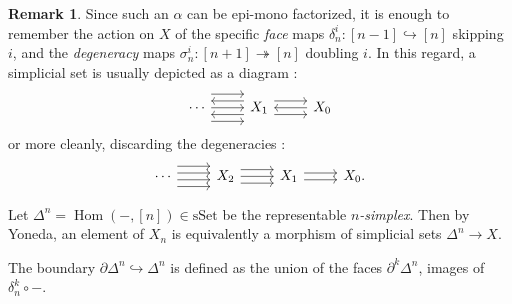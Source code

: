 \documentclass[11pt]{article}
\theoremstyle{definition}
\newtheorem{remark}[theorem]{Remark}
\newcommand{\Hom}{\operatorname{Hom}}
\newcommand{\sSet}{\mathrm{sSet}}
\begin{document}
\begin{remark}
    Since such an $\alpha$ can be epi-mono factorized, it is enough to remember the action on $X$ of the specific \emph{face} maps $\delta_n^i : [n-1] \hookrightarrow [n]$ skipping $i$, and the \emph{degeneracy} maps $\sigma_n^i : [n+1] \twoheadrightarrow [n]$ doubling $i$.
    In this regard, a simplicial set is usually depicted as a diagram :
    \[\begin{tikzcd}
        \cdots & {X_1} & {X_0}
        \arrow[from=1-1, to=1-2]
        \arrow[shift right=4, from=1-1, to=1-2]
        \arrow[shift left=4, from=1-1, to=1-2]
        \arrow[shift left=2, from=1-2, to=1-1]
        \arrow[shift right=2, from=1-2, to=1-1]
        \arrow[shift left=2, from=1-2, to=1-3]
        \arrow[shift right=2, from=1-2, to=1-3]
        \arrow[from=1-3, to=1-2]
    \end{tikzcd}\]
    or more cleanly, discarding the degeneracies :
    \[\begin{tikzcd}
        \cdots & {X_2} & {X_1} & {X_0.}
        \arrow[shift left, from=1-1, to=1-2]
        \arrow[shift left=3, from=1-1, to=1-2]
        \arrow[shift right, from=1-1, to=1-2]
        \arrow[shift right=3, from=1-1, to=1-2]
        \arrow[from=1-2, to=1-3]
        \arrow[shift left=2, from=1-2, to=1-3]
        \arrow[shift right=2, from=1-2, to=1-3]
        \arrow[shift left, from=1-3, to=1-4]
        \arrow[shift right, from=1-3, to=1-4]
    \end{tikzcd}\]
\end{remark}

Let $\Delta^n = \Hom(-, [n]) \in \sSet$ be the representable \emph{$n$-simplex}.
Then by Yoneda, an element of $X_n$ is equivalently a morphism of simplicial sets $\Delta^n \to X$.

The boundary $\partial \Delta^n \hookrightarrow \Delta^n$ is defined as the union of the faces $\partial^k \Delta^n$, images of $\delta_n^k \circ -$.
\end{document}
